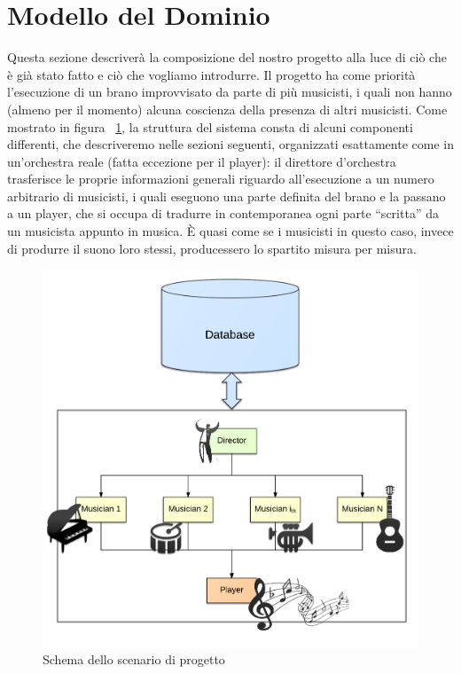 \section{Modello del Dominio}

Questa sezione descriverà la composizione del nostro progetto alla luce di ciò che è già stato fatto e ciò che vogliamo introdurre.
Il progetto ha come priorità l'esecuzione di un brano improvvisato da parte di più musicisti, i quali non hanno (almeno per il momento) alcuna coscienza della presenza di altri musicisti.
Come mostrato in figura ~\ref{fig:dom}, la struttura del sistema consta di alcuni componenti differenti, che descriveremo nelle sezioni seguenti, organizzati esattamente come in un'orchestra reale (fatta eccezione per il player):
il direttore d'orchestra trasferisce le proprie informazioni generali riguardo all'esecuzione a un numero arbitrario di musicisti, i quali eseguono una parte definita del brano e la passano a un player, che si occupa di tradurre in contemporanea ogni parte ``scritta'' da un musicista appunto in musica.
È quasi come se i musicisti in questo caso, invece di produrre il suono loro stessi, producessero lo spartito misura per misura.

\begin{figure}[H]
\centering
\includegraphics[scale=0.30]{img/model.png}
\caption{Schema dello scenario di progetto}
\label{fig:dom}
\end{figure}

